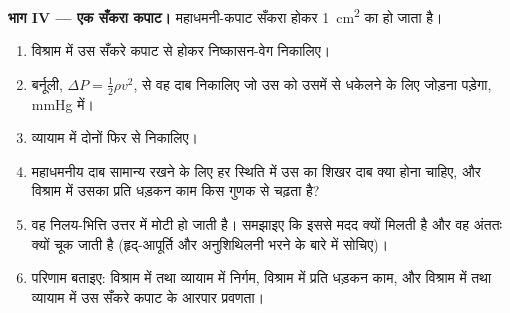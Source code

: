 \begin{problem}
\medskip
\noindent\textbf{भाग IV --- एक सँकरा कपाट।}
महाधमनी-कपाट सँकरा होकर \qty{1}{cm^2} का हो जाता है।
\begin{enumerate}[resume]
  \item विश्राम में उस सँकरे कपाट से होकर निष्कासन-वेग
        निकालिए।
  \item बर्नूली, $\Delta P = \tfrac12\rho v^{2}$, से वह दाब
        निकालिए जो उस  को  उसमें से धकेलने के लिए जोड़ना पड़ेगा,
        mmHg में।
  \item व्यायाम में दोनों फिर से निकालिए।
  \item महाधमनीय दाब सामान्य रखने के लिए हर स्थिति में उस  का
        शिखर दाब क्या होना चाहिए, और विश्राम में उसका
        प्रति धड़कन काम किस गुणक से चढ़ता है?
  \item वह निलय-भित्ति उत्तर में मोटी हो जाती है। समझाइए कि इससे
        मदद क्यों मिलती है और वह अंततः क्यों चूक जाती है (हृद्-आपूर्ति
        और अनुशिथिलनी भरने के बारे में सोचिए)।
  \item परिणाम बताइए: विश्राम में तथा व्यायाम में निर्गम,
        विश्राम में प्रति धड़कन काम, और विश्राम में तथा व्यायाम में उस
        सँकरे कपाट के आरपार प्रवणता।
\end{enumerate}
\end{problem}
